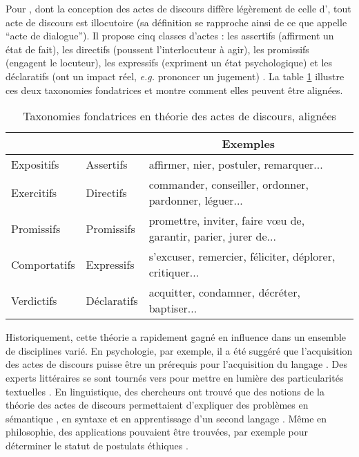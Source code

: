 \documentclass[10pt,a4paper,twoside]{article}
\newcommand{\quotes}[1]{``#1''}
\begin{document}
Pour \citet{searle1969speech}, dont la conception des actes de discours diffère légèrement de celle d'\citeauthor{austin1975how}, tout acte de discours est illocutoire (sa définition se rapproche ainsi de ce que \citeauthor{austin1975how} appelle \quotes{acte de dialogue}). Il propose cinq classes d’actes : les assertifs (affirment un état de fait), les directifs (poussent l'interlocuteur à agir), les promissifs (engagent le locuteur), les expressifs (expriment un état psychologique) et les déclaratifs (ont un impact réel, \textit{e.g.} prononcer un jugement) \cite{searle1976taxonomy}. La table \ref{fig:fundamentalTaxonomies} illustre ces deux taxonomies fondatrices et montre comment elles peuvent être alignées.

\begin{table}
	\centering
	\begin{tabular}{lll}
		\toprule
		\multicolumn{1}{c}{\citet{austin1975how}} & \multicolumn{1}{c}{\citet{searle1976taxonomy}} & \multicolumn{1}{c}{Exemples} \\
		\midrule
		Expositifs & Assertifs & affirmer, nier, postuler, remarquer... \\
		Exercitifs & Directifs & commander, conseiller, ordonner, pardonner, léguer... \\
		Promissifs & Promissifs & promettre, inviter, faire vœu de, garantir, parier, jurer de...  \\
		Comportatifs & Expressifs & s’excuser, remercier, féliciter, déplorer, critiquer... \\
		Verdictifs & Déclaratifs & acquitter, condamner, décréter, baptiser... \\
		\bottomrule
	\end{tabular}
	\caption{Taxonomies fondatrices en théorie des actes de discours, alignées}
	\label{fig:fundamentalTaxonomies}
\end{table}

Historiquement, cette théorie a rapidement gagné en influence dans un ensemble de disciplines varié. En psychologie, par exemple, il a été suggéré que l'acquisition des actes de discours puisse être un prérequis pour l'acquisition du langage \cite{bruner1975communication}. Des experts littéraires se sont tournés vers \citeauthor{austin1975how} pour mettre en lumière des particularités textuelles \cite{ohmann1971speech}. En linguistique, des chercheurs ont trouvé que des notions de la théorie des actes de discours permettaient d'expliquer des problèmes en sémantique \cite{fillmore1971some}, en syntaxe \cite{sadock1974toward} et en apprentissage d'un second langage \cite{jakobovits1974context}. Même en philosophie, des applications pouvaient être trouvées, par exemple pour déterminer le statut de postulats éthiques \cite{searle1969speech}.
\end{document}
